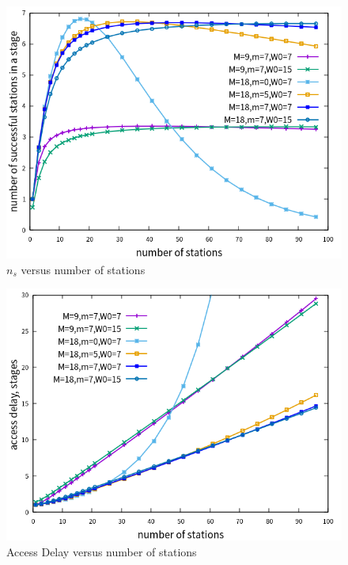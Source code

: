 \begin{figure}[!ht]
\includegraphics[scale=.54]{./figure/n_rule_ns_perf.png}
\caption{$n_s$ versus number of stations}
\label{fig_n_ns_val}
\end{figure}

\begin{figure}[!ht]
\includegraphics[scale=.54]{./figure/n_rule_delay_perf.png}
\caption{Access Delay versus number of stations}
\label{fig_n_delay_val}
\end{figure}
